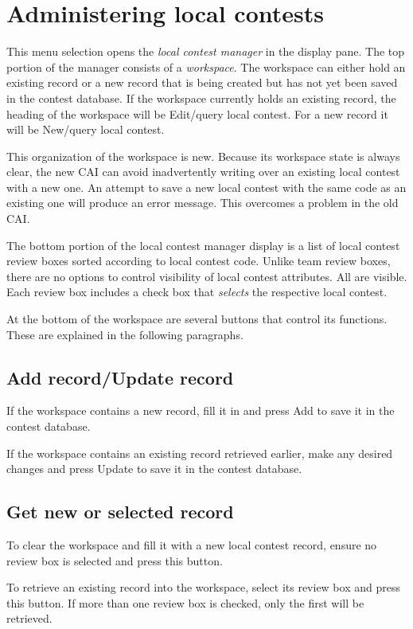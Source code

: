 \documentclass[11pt,letterpaper]{refart}
\def\ui#1{\textsf{#1}}
\begin{document}
\section{Administering local contests}
This menu selection opens the \emph{local contest manager} in the display pane.
The top portion of the manager consists of a \emph{workspace}.  The workspace
can either hold an existing record or a new record that is being created but has
not yet been saved in the contest database.  If the workspace currently holds
an existing record, the heading of the workspace will be 
\ui{Edit/query local contest}.  For a new record it will be \ui{New/query local contest}.

This organization of the workspace is new. Because its workspace state is always clear,
the new CAI can avoid inadvertently writing over an existing local contest with a new
one. An attempt to save a new local contest with the same code as an existing
one will produce an error message. This overcomes a problem in the old CAI.

The bottom portion of the local contest manager display
is a list of local contest review boxes sorted according to local contest code.  
Unlike team review boxes, there are no
options to control visibility of local contest attributes.  All are visible. Each review
box includes a check box that \emph{selects} the respective local contest.

At the bottom of the workspace are several buttons that control its functions. These
are explained in the following paragraphs.

\subsection{Add record/Update record}
If the workspace contains a new record, fill it in and press \ui{Add} to 
save it in the contest database. 

If the workspace contains an existing record retrieved earlier, make any
desired changes and press \ui{Update} to save it in the contest database.

\subsection{Get new or selected record}
To clear the workspace and fill it with a new local contest record, ensure no 
review box is selected and press this button.

To retrieve an existing record into the workspace, select 
its review box and press this button.  If more than one review box is
checked, only the first will be retrieved. 
\end{document}
